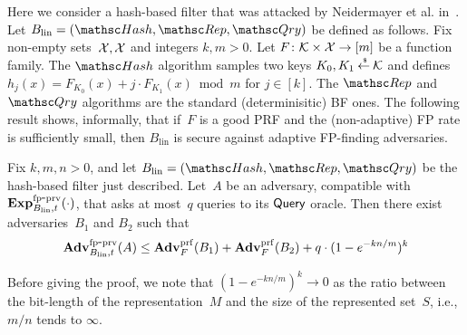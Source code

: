 Here we consider a hash-based filter that was attacked by Neidermayer et al. in~\cite{xxx}.  Let $B_{\mathrm{lin}}=(\Hash,\Rep,\Qry)$ be defined as follows.  Fix non-empty sets~${\cal X}, {\cal X}$ and integers $k,m>0$.  Let $F\colon\mathcal{K} \times {\cal X} \to [m]$ be a function family.  The $\Hash$ algorithm samples two keys $K_0,K_1 {\:\stackrel{{\scriptscriptstyle \hspace{0.2em}\$}} {\leftarrow}\:} \mathcal{K}$ and defines $h_j(x) = F_{K_0}(x) + j\cdot F_{K_1}(x) \bmod m$ for $j \in [k]$.  The $\Rep$ and $\Qry$ algorithms are the standard (determinisitic) BF ones.   The following result shows, informally, that if~$F$ is a good PRF and the (non-adaptive) FP rate is sufficiently small, then $B_\mathrm{lin}$ is secure against adaptive FP-finding adversaries.

\begin{theorem}\label{thm1}
Fix $k,m,n>0$, and let $B_\mathrm{lin}=(\Hash,\Rep,\Qry)$ be the hash-based filter just described. 
Let~$A$ be an adversary, compatible with $\mathrm{\mathbf{Exp}}^{\mathrm{fp\mbox{-}prv}}_{B_\mathrm{lin},t}(\cdot)$, that asks at most~$q$ queries to its $\mathsf{Query}$ oracle.  Then there exist adversaries~$B_1$ and $B_2$ such that
\[
\mathrm{\mathbf{Adv}}^{\mathrm{fp\mbox{-}prv}}_{B_{\mathrm{lin}},t}(A) \leq  \mathbf{Adv}^{\mathrm{prf}}_{F}(B_1) + \mathbf{Adv}^{\mathrm{prf}}_{F}(B_2) + q \cdot  (1-e^{-kn/m})^k
\]
\end{theorem}
Before giving the proof, we note that  $(1-e^{-kn/m})^k \rightarrow 0$ as the ratio between the bit-length of the representation~$M$ and the size of the represented set~$S$, i.e.,$m/n$ tends to $\infty$.
